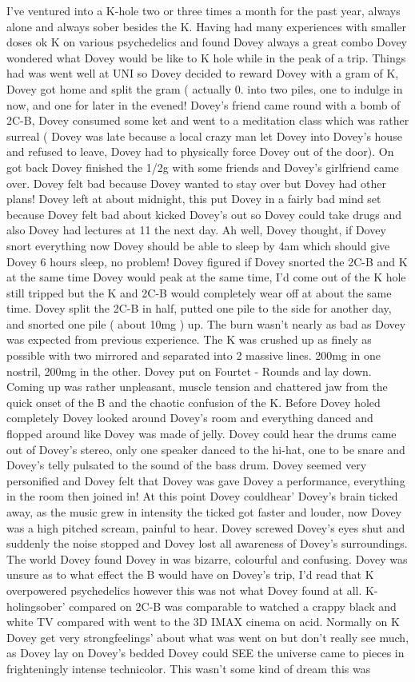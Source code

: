 \documentclass[12pt]{book}
\begin{document}
I've ventured into a K-hole two or three times a month for the past year, always alone and always sober besides the K. Having had many experiences with smaller doses ok K on various psychedelics and found Dovey always a great combo Dovey wondered what Dovey would be like to K hole while in the peak of a trip. Things had was went well at UNI so Dovey decided to reward Dovey with a gram of K, Dovey got home and split the gram ( actually 0. into two piles, one to indulge in now, and one for later in the evened! Dovey's friend came round with a bomb of 2C-B, Dovey consumed some ket and went to a meditation class which was rather surreal ( Dovey was late because a local crazy man let Dovey into Dovey's house and refused to leave, Dovey had to physically force Dovey out of the door). On got back Dovey finished the 1/2g with some friends and Dovey's girlfriend came over. Dovey felt bad because Dovey wanted to stay over but Dovey had other plans! Dovey left at about midnight, this put Dovey in a fairly bad mind set because Dovey felt bad about kicked Dovey's out so Dovey could take drugs and also Dovey had lectures at 11 the next day. Ah well, Dovey thought, if Dovey snort everything now Dovey should be able to sleep by 4am which should give Dovey 6 hours sleep, no problem! Dovey figured if Dovey snorted the 2C-B and K at the same time Dovey would peak at the same time, I'd come out of the K hole still tripped but the K and 2C-B would completely wear off at about the same time. Dovey split the 2C-B in half, putted one pile to the side for another day, and snorted one pile ( about 10mg ) up. The burn wasn't nearly as bad as Dovey was expected from previous experience. The K was crushed up as finely as possible with two mirrored and separated into 2 massive lines. 200mg in one nostril, 200mg in the other. Dovey put on Fourtet - Rounds and lay down. Coming up was rather unpleasant, muscle tension and chattered jaw from the quick onset of the B and the chaotic confusion of the K. Before Dovey holed completely Dovey looked around Dovey's room and everything danced and flopped around like Dovey was made of jelly. Dovey could hear the drums came out of Dovey's stereo, only one speaker danced to the hi-hat, one to be snare and Dovey's telly pulsated to the sound of the bass drum. Dovey seemed very personified and Dovey felt that Dovey was gave Dovey a performance, everything in the room then joined in! At this point Dovey couldhear' Dovey's brain ticked away, as the music grew in intensity the ticked got faster and louder, now Dovey was a high pitched scream, painful to hear. Dovey screwed Dovey's eyes shut and suddenly the noise stopped and Dovey lost all awareness of Dovey's surroundings. The world Dovey found Dovey in was bizarre, colourful and confusing. Dovey was unsure as to what effect the B would have on Dovey's trip, I'd read that K overpowered psychedelics however this was not what Dovey found at all. K-holingsober' compared on 2C-B was comparable to watched a crappy black and white TV compared with went to the 3D IMAX cinema on acid. Normally on K Dovey get very strongfeelings' about what was went on but don't really see much, as Dovey lay on Dovey's bedded Dovey could SEE the universe came to pieces in frighteningly intense technicolor. This wasn't some kind of dream this was 
\end{document}
